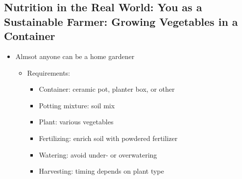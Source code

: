 \documentclass[12pt]{article}
\begin{document}
        \subsection{Nutrition in the Real World: You as a Sustainable Farmer: Growing Vegetables in a Container}
            \begin{itemize}
                \item Almsot anyone can be a home gardener
                    \begin{itemize}
                        \item Requirements:
                            \begin{itemize}
                                \item Container: ceramic pot, planter box, or other
                                \item Potting mixture: soil mix
                                \item Plant: various vegetables
                                \item Fertilizing: enrich soil with powdered fertilizer
                                \item Watering: avoid under- or overwatering
                                \item Harvesting: timing depends on plant type
                            \end{itemize}
                    \end{itemize}
            \end{itemize}
        
\end{document}
